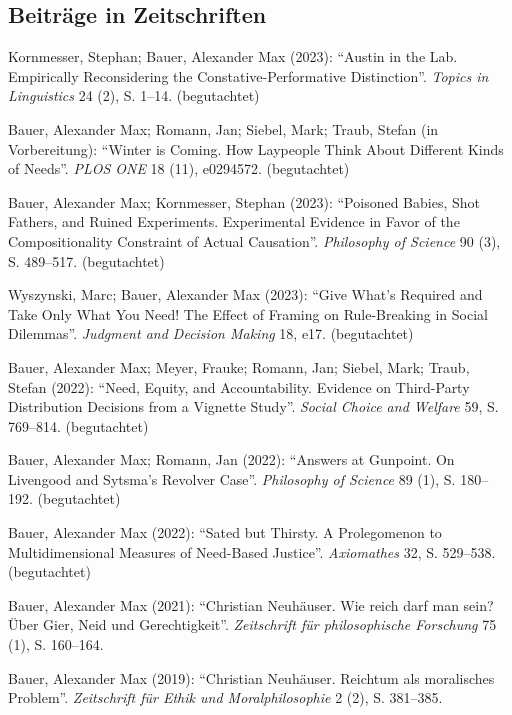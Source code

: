\documentclass[a4paper,10pt]{article}
\newenvironment{literature}{%
   \parskip6pt\parindent0pt\raggedright
   \def\lititem{\hangindent=1cm\hangafter1}}{%
   \par\ignorespaces}
\begin{document}
\subsection*{Beiträge in Zeitschriften}
\begin{literature}
\lititem Kornmesser, Stephan; Bauer, Alexander Max (2023): \enquote{Austin in the Lab. Empirically Reconsidering the Constative-Performative Distinction}. \textit{Topics in Linguistics} 24 (2), S. 1--14. (begutachtet)

\lititem Bauer, Alexander Max; Romann, Jan; Siebel, Mark; Traub, Stefan (in Vorbereitung): \enquote{Winter is Coming. How Laypeople Think About Different Kinds of Needs}. \textit{PLOS ONE} 18 (11), e0294572. (begutachtet)

\lititem Bauer, Alexander Max; Kornmesser, Stephan (2023): \enquote{Poisoned Babies, Shot Fathers, and Ruined Experiments. Experimental Evidence in Favor of the Compositionality Constraint of Actual Causation}. \textit{Philosophy of Science} 90 (3), S. 489--517. (begutachtet)

\lititem Wyszynski, Marc; Bauer, Alexander Max (2023): \enquote{Give What's Required and Take Only What You Need! The Effect of Framing on Rule-Breaking in Social Dilemmas}. \textit{Judgment and Decision Making} 18, e17. (begutachtet)

\lititem Bauer, Alexander Max; Meyer, Frauke; Romann, Jan; Siebel, Mark; Traub, Stefan (2022): \enquote{Need, Equity, and Accountability. Evidence on Third-Party Distribution Decisions from a Vignette Study}. \textit{Social Choice and Welfare} 59, S. 769--814. (begutachtet)

\lititem Bauer, Alexander Max; Romann, Jan (2022): \enquote{Answers at Gunpoint. On Livengood and Sytsma's Revolver Case}. \textit{Philosophy of Science} 89 (1), S. 180--192. (begutachtet)

\lititem Bauer, Alexander Max (2022): \enquote{Sated but Thirsty. A Prolegomenon to Multidimensional Measures of Need-Based Justice}. \textit{Axiomathes} 32, S. 529--538. (begutachtet)

\lititem Bauer, Alexander Max (2021): \enquote{Christian Neuhäuser. Wie reich darf man
sein? Über Gier, Neid und Gerechtigkeit}. \textit{Zeitschrift für philosophische Forschung} 75 (1), S. 160--164.

\lititem Bauer, Alexander Max (2019): \enquote{Christian Neuhäuser. Reichtum als moralisches Problem}. \textit{Zeitschrift für Ethik und Moralphilosophie} 2 (2), S. 381--385.


\end{literature}
\end{document}
